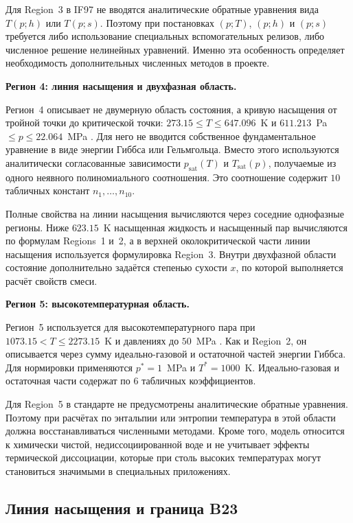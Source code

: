 Для Region~3 в IF97 не вводятся аналитические обратные уравнения
вида $T(p; h)$ или $T(p; s)$.
Поэтому при постановках $(p; T)$, $(p; h)$ и $(p; s)$
требуется либо использование специальных вспомогательных релизов,
либо численное решение нелинейных уравнений.
Именно эта особенность определяет необходимость
дополнительных численных методов в проекте.

\noindent\textbf{Регион 4: линия насыщения и двухфазная область.}

Регион~4 описывает не двумерную область состояния,
а кривую насыщения от тройной точки до критической точки:
$273.15 \le T \le 647.096$~K
и $611.213$~Pa $\le p \le 22.064$~MPa
\cite{iapws_if97_2012}.
Для него не вводится собственное фундаментальное уравнение
в виде энергии Гиббса или Гельмгольца.
Вместо этого используются аналитически согласованные зависимости
$p_{\mathrm{sat}}(T)$ и $T_{\mathrm{sat}}(p)$,
получаемые из одного неявного полиномиального соотношения.
Это соотношение содержит $10$ табличных констант
$n_1,\dots,n_{10}$.

Полные свойства на линии насыщения
вычисляются через соседние однофазные регионы.
Ниже $623.15$~K насыщенная жидкость
и насыщенный пар вычисляются по формулам Regions~1 и~2,
а в верхней околокритической части линии насыщения
используется формулировка Region~3.
Внутри двухфазной области состояние дополнительно задаётся
степенью сухости $x$,
по которой выполняется расчёт свойств смеси.

\noindent\textbf{Регион 5: высокотемпературная область.}

Регион~5 используется для высокотемпературного пара
при $1073.15 < T \le 2273.15$~K
и давлениях до $50$~MPa \cite{iapws_if97_2012}.
Как и Region~2,
он описывается через сумму идеально-газовой
и остаточной частей энергии Гиббса.
Для нормировки применяются
$p^{*}=1$~MPa и $T^{*}=1000$~K.
Идеально-газовая и остаточная части
содержат по $6$ табличных коэффициентов.

Для Region~5 в стандарте не предусмотрены
аналитические обратные уравнения.
Поэтому при расчётах по энтальпии или энтропии
температура в этой области
должна восстанавливаться численными методами.
Кроме того, модель относится к химически чистой,
недиссоциированной воде
и не учитывает эффекты термической диссоциации,
которые при столь высоких температурах
могут становиться значимыми в специальных приложениях.

\subsection{Линия насыщения и граница B23}

